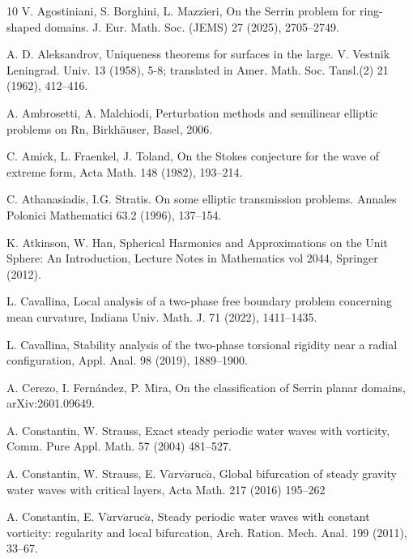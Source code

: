 \documentclass[reqno]{amsart}
\numberwithin{equation}{section}
\numberwithin{equation}{section}
\numberwithin{equation}{section}
\begin{document}
\begin{thebibliography}{10}
 V. Agostiniani, S. Borghini, L. Mazzieri, On the Serrin problem for ring-shaped domains. J. Eur. Math. Soc. (JEMS) 27 (2025), 2705--2749.

 A. D. Aleksandrov, Uniqueness theorems for surfaces in the large. V. Vestnik Leningrad. Univ. 13 (1958), 5-8; translated in Amer. Math. Soc. Tansl.(2) 21 (1962), 412--416.

 A. Ambrosetti, A. Malchiodi, Perturbation methods and semilinear elliptic problems on Rn, Birkh\"auser, Basel, 2006.

 C. Amick, L. Fraenkel, J. Toland, On the Stokes conjecture for the wave of extreme form, Acta Math. 148
(1982), 193--214.


 C. Athanasiadis, I.G. Stratis. On some elliptic transmission problems. Annales Polonici
Mathematici 63.2 (1996), 137--154.


 K. Atkinson, W. Han, Spherical Harmonics and Approximations on the Unit Sphere: An
Introduction, Lecture Notes in Mathematics vol 2044, Springer (2012).

 L. Cavallina, Local analysis of a two-phase free boundary problem concerning mean curvature, Indiana Univ. Math. J. 71 (2022), 1411--1435.

 L. Cavallina, Stability analysis of the two-phase torsional rigidity near a radial configuration, Appl. Anal. 98 (2019), 1889--1900.

 A. Cerezo, I. Fern\'{a}ndez, P. Mira, On the classification of Serrin planar domains, arXiv:2601.09649.

 A. Constantin, W. Strauss, Exact steady periodic water waves with vorticity, Comm. Pure Appl. Math. 57
(2004) 481--527.

 A. Constantin, W. Strauss, E. V$\breve{a}$rv$\breve{a}$ruc$\breve{a}$, Global bifurcation of steady gravity water waves with critical
layers, Acta Math. 217 (2016) 195--262

A. Constantin, E. V$\breve{a}$rv$\breve{a}$ruc$\breve{a}$, Steady
periodic water waves with constant vorticity: regularity and local
bifurcation, Arch. Ration. Mech. Anal. 199 (2011), 33--67.



\end{thebibliography}
\end{document}
